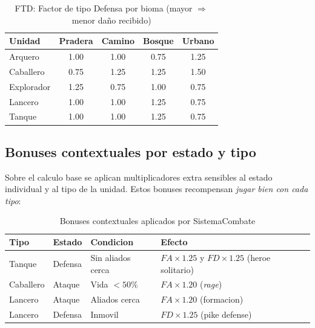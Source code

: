 \documentclass[12pt,a4paper]{article}
\newcommand{\bonus}[1]{\cellcolor{bonusgreen}#1}
\newcommand{\malus}[1]{\cellcolor{malusred}#1}
\newcommand{\neutral}[1]{\cellcolor{neutralgray}#1}
\begin{document}
\begin{table}[H]
\centering
\caption{FTD: Factor de tipo Defensa por bioma (mayor $\Rightarrow$ menor daño recibido)}
\label{tab:ftd}
\begin{tabular}{l|cccc}
\toprule
\textbf{Unidad} & \textbf{Pradera} & \textbf{Camino} & \textbf{Bosque} & \textbf{Urbano} \\
\midrule
Arquero    & \neutral{1.00} & \neutral{1.00} & \malus{0.75} & \bonus{1.25} \\
Caballero  & \malus{0.75} & \bonus{1.25} & \bonus{1.25} & \bonus{1.50} \\
Explorador & \bonus{1.25} & \malus{0.75} & \neutral{1.00} & \malus{0.75} \\
Lancero    & \neutral{1.00} & \neutral{1.00} & \bonus{1.25} & \malus{0.75} \\
Tanque     & \neutral{1.00} & \neutral{1.00} & \bonus{1.25} & \malus{0.75} \\
\bottomrule
\end{tabular}
\end{table}

\subsection{Bonuses contextuales por estado y tipo}

Sobre el calculo base se aplican multiplicadores extra sensibles al
estado individual y al tipo de la unidad. Estos bonuses recompensan
\emph{jugar bien con cada tipo}:

\begin{table}[H]
\centering
\caption{Bonuses contextuales aplicados por SistemaCombate}
\label{tab:bonus}
\renewcommand{\arraystretch}{1.2}
\begin{tabularx}{\textwidth}{l l l l}
\toprule
\textbf{Tipo} & \textbf{Estado} & \textbf{Condicion} & \textbf{Efecto} \\
\midrule
Tanque    & Defensa & Sin aliados cerca & $FA \times 1.25$ y $FD \times 1.25$ (heroe solitario) \\
Caballero & Ataque  & Vida $< 50\%$    & $FA \times 1.20$ (\emph{rage}) \\
Lancero   & Ataque  & Aliados cerca    & $FA \times 1.20$ (formacion) \\
Lancero   & Defensa & Inmovil          & $FD \times 1.25$ (pike defense) \\
\bottomrule
\end{tabularx}
\end{table}
\end{document}
